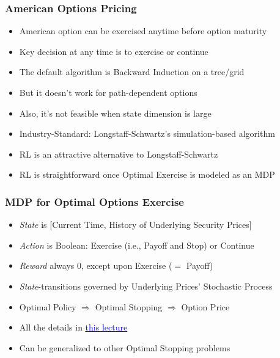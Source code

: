 \documentclass[handout]{beamer}
\begin{document}
\begin{frame}
\frametitle{American Options Pricing}
\pause
\begin{itemize}[<+->]
\item American option can be exercised anytime before option maturity
\item Key decision at any time is to exercise or continue
\item The default algorithm is Backward Induction on a tree/grid
\item But it doesn't work for path-dependent options 
\item Also, it's not feasible when state dimension is large
\item Industry-Standard: Longstaff-Schwartz's simulation-based algorithm
\item RL is an attractive alternative to Longstaff-Schwartz
\item RL is straightforward once Optimal Exercise is modeled as an MDP
\end{itemize}
\end{frame}

\begin{frame}
\frametitle{MDP for Optimal Options Exercise}
\pause
\begin{itemize}[<+->]
\item {\em State} is [Current Time, History of Underlying Security Prices]
\item {\em Action} is Boolean: Exercise (i.e., Payoff and Stop) or Continue
\item {\em Reward} always 0, except upon Exercise ($=$ Payoff)
\item {\em State}-transitions governed by Underlying Prices' Stochastic Process
\item Optimal Policy $\Rightarrow$ Optimal Stopping $\Rightarrow$ Option Price
\item All the details in \href{https://github.com/coverdrive/technical-documents/blob/master/finance/cme241/AmericanOptionsRL.pdf}{\underline{\textcolor{blue}{this lecture}}}
\item Can be generalized to other Optimal Stopping problems
\end{itemize}
\end{frame}
\end{document}
